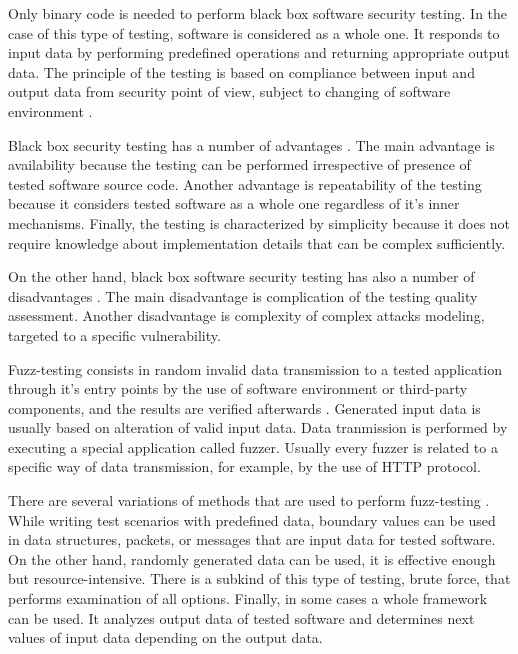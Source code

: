 %
Only binary code is needed to perform black box software security testing. 
%
In the case of this type of testing, software is considered as a whole one. 
%
It responds to input data by performing predefined operations and returning appropriate output data. 
%
The principle of the testing is based on compliance between input and output data from security point of view, subject to changing of software environment . 

%
Black box security testing has a number of advantages . 
%
The main advantage is availability because the testing can be performed irrespective of presence of tested software source code. 
%
Another advantage is repeatability of the testing because it considers tested software as a whole one regardless of it's inner mechanisms. 
%
Finally, the testing is characterized by simplicity because it does not require knowledge about implementation details that can be complex sufficiently. 

%
On the other hand, black box software security testing has also a number of disadvantages . 
%
The main disadvantage is complication of the testing quality assessment. 
%
Another disadvantage is complexity of complex attacks modeling, targeted to a specific vulnerability. 



%
Fuzz-testing consists in random invalid data transmission to a tested application through it's entry points by the use of software environment or third-party components, and the results are verified afterwards . 
%
Generated input data is usually based on alteration of valid input data. 
%
Data tranmission is performed by executing a special application called fuzzer. 
%
Usually every fuzzer is related to a specific way of data transmission, for example, by the use of HTTP protocol. 

%
There are several variations of methods that are used to perform fuzz-testing . 
%
While writing test scenarios with predefined data, boundary values can be used in data structures, packets, or messages that are input data for tested software. 
%
On the other hand, randomly generated data can be used, it is effective enough but resource-intensive. 
%
There is a subkind of this type of testing, brute force, that performs examination of all options. 
%
Finally, in some cases a whole framework can be used. 
%
It analyzes output data of tested software and determines next values of input data depending on the output data. 

